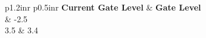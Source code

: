 \footnotesize
\begin{table}[!h]
\centering
\caption{Control strategy for G211 close (Units are ft. NGVD29)}
\label{tab:CS-G211close}
\begin{tabular}{p{1.2in}{r} p{0.5in}{r}}
\hline
\textbf{Current Gate Level} & \textbf{Gate Level}\\
	& -2.5       \\
3.5	& 3.4   \\
\hline
\end{tabular}
\end{table}
\normalsize



%
%





\clearpage
